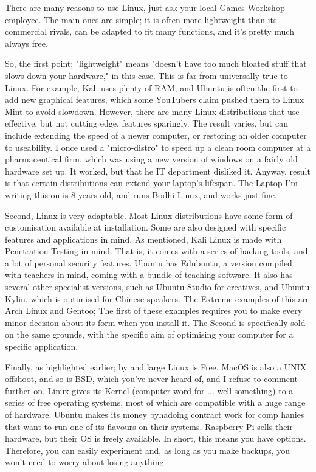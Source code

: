 \documentclass{book}
\begin{document}
There are many reasons to use Linux, just ask your local Games Workshop employee. The main ones are simple; it is often more lightweight than its commercial rivals, can be adapted to fit many functions, and it's pretty much always free. 

So, the first point; "lightweight" means "doesn't have too much bloated stuff that slows  down your hardware," in this case. This is far from universally true to Linux. For example, Kali uses plenty of RAM, and Ubuntu is often the first to add new graphical features, which some YouTubers claim pushed them to Linux Mint to avoid slowdown. However, there are many Linux distributions that use effective, but not cutting edge, features sparingly. The result varies, but can include extending the speed of a newer computer, or restoring an older computer to useability. I once used a "micro-distro" to speed up a clean room computer at a pharmaceutical firm, which was using a new version of windows on a fairly old hardware set up. It worked, but that  he IT department disliked it. Anyway, result is that certain distributions can extend your laptop's lifespan. The Laptop I'm writing this on is 8 years old, and runs Bodhi Linux, and works just fine.

Second, Linux is very adaptable. Most Linux distributions have some form of customisation available at installation. Some are also designed with specific features and applications in mind. As mentioned, Kali Linux is made with Penetration Testing in mind. That is, it comes with a series of hacking tools, and a lot of personal security features. Ubuntu has Edubuntu, a version compiled with teachers in mind, coming with a bundle of teaching software. It also has several other specialist versions, such as Ubuntu Studio for creatives, and Ubuntu Kylin, which is optimised for Chinese speakers. The Extreme examples of this are Arch Linux and Gentoo; The first of these examples requires you to make every minor decision about its form when you install it. The Second is specifically sold on the same grounds, with the specific aim of optimising your computer for a specific application. 

Finally, as highlighted earlier; by and large Linux is Free. MacOS is also a UNIX offshoot, and so is BSD, which you've never heard of, and I refuse to comment further on. Linux gives its Kernel (computer word for ... well something) to a series of free operating systems, most of which are compatible with a huge range of hardware. Ubuntu makes its money byhadoing contract work for comp hanies that want to run one of its flavours on their systems. Raspberry Pi sells their hardware, but their OS is freely available. In short, this means you have options. Therefore, you can easily experiment and, as long as you make backups, you won't need to worry about losing anything.
\end{document}
